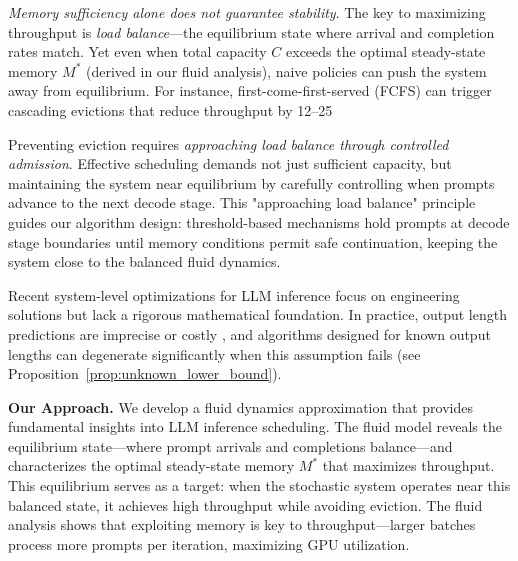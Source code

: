 \emph{Memory sufficiency alone does not guarantee stability}. The key to maximizing throughput is \emph{load balance}---the equilibrium state where arrival and completion rates match. Yet even when total capacity $C$ exceeds the optimal steady-state memory $M^*$ (derived in our fluid analysis), naive policies can push the system away from equilibrium. For instance, first-come-first-served (FCFS) can trigger cascading evictions that reduce throughput by 12--25%

Preventing eviction requires \emph{approaching load balance through controlled admission}. Effective scheduling demands not just sufficient capacity, but maintaining the system near equilibrium by carefully controlling when prompts advance to the next decode stage. This "approaching load balance" principle guides our algorithm design: threshold-based mechanisms hold prompts at decode stage boundaries until memory conditions permit safe continuation, keeping the system close to the balanced fluid dynamics.

Recent system-level optimizations for LLM inference \citep{yu2022orca, kwon2023efficient, agrawal2023sarathi, pope2023efficiently, deepseekai2024deepseekv2strongeconomicalefficient, patel2024splitwise, zhong2024distserve} focus on engineering solutions but lack a rigorous mathematical foundation. In practice, output length predictions are imprecise or costly \citep{fu2025efficient}, and algorithms designed for known output lengths can degenerate significantly when this assumption fails (see Proposition~\ref{prop:unknown_lower_bound}).

\textbf{Our Approach.} We develop a fluid dynamics approximation that provides fundamental insights into LLM inference scheduling. The fluid model reveals the equilibrium state---where prompt arrivals and completions balance---and characterizes the optimal steady-state memory $M^*$ that maximizes throughput. This equilibrium serves as a target: when the stochastic system operates near this balanced state, it achieves high throughput while avoiding eviction. The fluid analysis shows that exploiting memory is key to throughput---larger batches process more prompts per iteration, maximizing GPU utilization.

